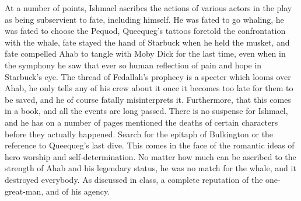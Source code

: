 \documentclass[
]{article}
\begin{document}
At a number of points, Ishmael ascribes the actions of various actors in
the play as being subservient to fate, including himself. He was fated
to go whaling, he was fated to choose the Pequod, Queequeg's tattoos
foretold the confrontation with the whale, fate stayed the hand of
Starbuck when he held the musket, and fate compelled Ahab to tangle with
Moby Dick for the last time, even when in the symphony he saw that ever
so human reflection of pain and hope in Starbuck's eye. The thread of
Fedallah's prophecy is a specter which looms over Ahab, he only tells
any of his crew about it once it becomes too late for them to be saved,
and he of course fatally misinterprets it. Furthermore, that this comes
in a book, and all the events are long passed. There is no suspense for
Ishmael, and he has on a number of pages mentioned the deaths of certain
characters before they actually happened. Search for the epitaph of
Bulkington or the reference to Queequeg's last dive. This comes in the
face of the romantic ideas of hero worship and self-determination. No
matter how much can be ascribed to the strength of Ahab and his
legendary status, he was no match for the whale, and it destroyed
everybody. As discussed in class, a complete reputation of the
one-great-man, and of his agency.
\end{document}
